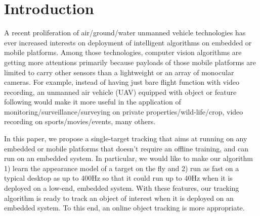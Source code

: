 \documentclass[10pt,twocolumn,letterpaper]{article}
\newcounter{ct}
\begin{document}
\section{Introduction}

A recent proliferation of air/ground/water unmanned vehicle
technologies has ever increased interests on deployment of intelligent
algorithms on embedded or mobile platforms. Among those technologies,
computer vision algorithms are getting more attentions primarily
because payloads of those mobile platforms are limited to carry other
sensors than a lightweight or an array of monocular cameras. For
example, instead of having just bare flight function with video
recording, an unmanned air vehicle (UAV) equipped with object or
feature following would make it more useful in the application of
monitoring/surveillance/surveying on private
properties/wild-life/crop, video recording on sports/movies/events,
many others.

In this paper, we propose a single-target tracking that aims at
running on any embedded or mobile platforms that doesn't require an
offline training, and can run on an embedded system. In particular, we
would like to make our algorithm 1) learn the appearance model of a
target on the fly and 2) run as fast on a typical desktop as up to
400Hz so that it could run up to 40Hz when it is deployed on a
low-end, embedded system. With these features, our tracking algorithm
is ready to track an object of interest when it is deployed on an
embedded system. To this end, an online object tracking is more
appropriate.
\end{document}
